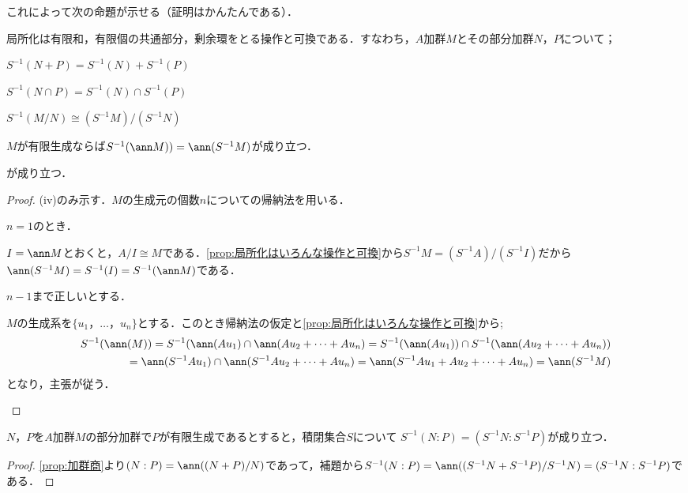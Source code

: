 これによって次の命題が示せる（証明はかんたんである）．
\begin{prop}\label{prop:局所化はいろんな操作と可換}
	局所化は有限和，有限個の共通部分，剰余環をとる操作と可換である．すなわち，$A$加群$M$とその部分加群$N，P$について；
	\begin{sakura}
		\item $S^{-1}(N+P)=S^{-1}(N)+S^{-1}(P)$
		\item $S^{-1}(N\cap P)=S^{-1}(N)\cap S^{-1}(P)$
		\item $S^{-1}(M/N)\cong (S^{-1}M)/(S^{-1}N)$
		\item $M$が有限生成ならば$S^{-1}(\ann M))=\ann(S^{-1}M)$が成り立つ．
	\end{sakura}
	が成り立つ．
\end{prop}
\begin{proof}
	(iv)のみ示す．$M$の生成元の個数$n$についての帰納法を用いる．
	\begin{step}
		\item $n=1$のとき．
		
		$I=\ann M$とおくと，$A/I\cong M$である．\ref{prop:局所化はいろんな操作と可換}から$S^{-1}M=(S^{-1}A)/(S^{-1}I)$だから$\ann (S^{-1}M)=S^{-1}(I)=S^{-1}(\ann M)$である．
		
		\item $n-1$まで正しいとする．
		
		$M$の生成系を$\{u_1，\dots，u_n\}$とする．このとき帰納法の仮定と\ref{prop:局所化はいろんな操作と可換}から;
		\[\begin{aligned}S^{-1}(\ann (M))=S^{-1}(\ann(Au_1)\cap\ann (Au_2+\dots+Au_n)=S^{-1}(\ann (Au_1))\cap S^{-1}(\ann (Au_2+\dots+Au_n))\\
		=\ann (S^{-1}Au_1)\cap\ann(S^{-1}Au_2+\dots+Au_n)=\ann (S^{-1}Au_1+Au_2+\dots+Au_n)=\ann (S^{-1}M)\end{aligned}\]
		となり，主張が従う．
	\end{step} 
\end{proof}

\begin{cor}\label{prop:イデアル商は局所化と可換}
	$N，P$を$A$加群$M$の部分加群で$P$が有限生成であるとすると，積閉集合$S$について $S^{-1}(N:P)=(S^{-1}N:S^{-1}P)$が成り立つ．
\end{cor}
\begin{proof}	
	\ref{prop:加群商}より$(N:P)=\ann((N+P)/N)$であって，補題から$S^{-1}(N:P)=\ann ((S^{-1}N+S^{-1}P)/S^{-1}N)=(S^{-1}N:S^{-1}P)$である．	
\end{proof}

